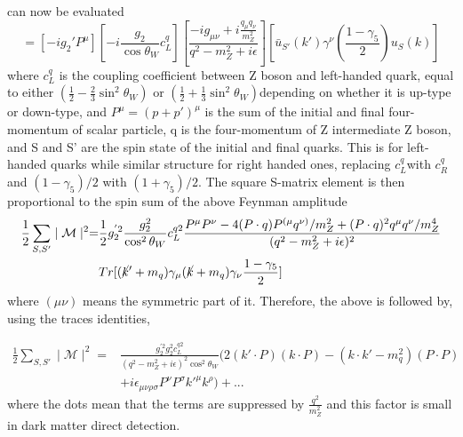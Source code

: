 \documentclass[12pt]{article}
\begin{document}
can now be evaluated 
$$
= [- i g_2' P^\mu][ - i\frac{g_2}{\cos \theta_W}  c_L^q] [\frac{-i g_{\mu\nu}+i \frac{q_\mu q_\nu }{m_Z^2} }{q^2-m_Z^2 + i\epsilon } ] [\bar u_{S'}(k')   \gamma^\nu  (\frac{1-\gamma_5}{2}) u_S(k)]
$$
where $c_L^q$ is the coupling coefficient between Z boson and left-handed quark, equal to either $ (\frac{1}{2} - \frac{2}{3} \sin^2 \theta_W)$ or $ (\frac{1}{2} + \frac{1}{3} \sin^2 \theta_W)$depending on whether it is up-type or down-type, and $P^\mu =( p+p')^\mu$ is the sum of the initial and final four-momentum of scalar particle, q is the four-momentum of Z intermediate Z boson, and S and S' are the spin state of the initial and final quarks. This is for left-handed quarks while similar structure for right handed ones, replacing $c_L^q$with $c^q_R$ and $(1- \gamma_5)/2$ with $(1+\gamma_5)/2$. The square S-matrix element is then proportional to the spin sum of the above Feynman amplitude
\begin{equation}
\begin{aligned}
\frac{1}{2}\sum_{S,S'} \mid \mathcal M \mid ^2 = 
&
\frac{1}{2} g_2 ^{'2} \frac{g_2^2}{\cos^2 \theta_W} c^{q2}_L \frac{P^\mu P^\nu - 4(P \cdot q ) P^{(\mu} q^{\nu)} / m_Z^2 + (P \cdot q )^2 q^\mu q^\nu / m_Z^4 }{(q^2-m_Z^2 +i\epsilon)^2} \\
 &  Tr[(\cancel k'+m_q)  \gamma_\mu (\cancel k+m_q) \gamma_\nu \frac{1-\gamma_5}{2}]
\end{aligned}
\end{equation}
where $(\mu \nu)$ means the symmetric part of it. Therefore, the above is followed by, using the traces identities, 

\begin{equation}
\begin{aligned}
\frac{1}{2}\sum_{S,S'} \mid \mathcal M \mid ^2 = 
&
 \frac{ g_2 ^{'2} g_2 ^2  c_L^{q2}}{(q^2-m_Z^2 +i\epsilon)^2\cos^2 \theta_W} 
  (2(k' \cdot P)(k \cdot P)-( k \cdot k' - m_q^2)(P \cdot P )\\
 &
 + i  \epsilon_{\mu\nu\rho\sigma} P^\nu P^\sigma k'^\mu k^\rho ) + ...
\end{aligned}
\end{equation}
where the dots mean that the terms are suppressed by $\frac{q^2}{m_Z^2}$ and this factor is small in dark matter direct detection. 
\end{document}
